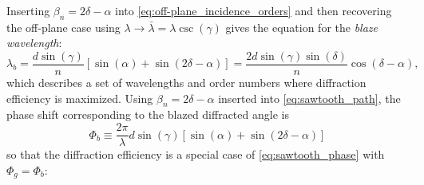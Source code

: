 Inserting $\beta_n = 2 \delta - \alpha$ into \cref{eq:off-plane_incidence_orders} and then recovering the off-plane case using $\lambda \to \bar{\lambda} = \lambda \csc (\gamma)$ gives the equation for the \emph{blaze wavelength}: 
\begin{equation}\label{eq:blaze_wavelength_general}
 \lambda_b = \frac{d \sin \left( \gamma \right)}{n} \left[ \sin \left( \alpha \right) + \sin \left( 2 \delta - \alpha \right)  \right] = \frac{2 d \sin \left( \gamma \right) \sin \left( \delta \right)}{n} \cos \left( \delta - \alpha \right)  ,
 \end{equation}
which describes a set of wavelengths and order numbers where diffraction efficiency is maximized. 
Using $\beta_n = 2 \delta - \alpha$ inserted into \cref{eq:sawtooth_path}, the phase shift corresponding to the blazed diffracted angle is
\begin{equation}\label{eq:sawtooth_path_blaze}
 \Phi_b  \equiv \frac{2 \pi}{\lambda} d \sin (\gamma) \left[ \sin (\alpha) + \sin (2 \delta - \alpha) \right] 
 \end{equation}
so that the diffraction efficiency is a special case of \cref{eq:sawtooth_phase} with $\Phi_g = \Phi_b$:
